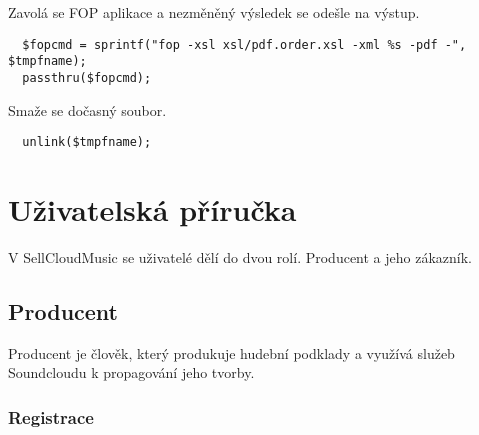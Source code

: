 \documentclass[12pt]{article}
\begin{document}
Zavolá se FOP aplikace a nezměněný výsledek se odešle na výstup.
\begin{lstlisting}
  $fopcmd = sprintf("fop -xsl xsl/pdf.order.xsl -xml %s -pdf -", $tmpfname);
  passthru($fopcmd);
\end{lstlisting}

Smaže se dočasný soubor.
\begin{lstlisting}
  unlink($tmpfname);
\end{lstlisting}    

\newpage

\section{Uživatelská příručka}

V SellCloudMusic se uživatelé dělí do dvou rolí. Producent a jeho zákazník.

\subsection{Producent}

Producent je člověk, který produkuje hudební podklady a využívá služeb Soundcloudu k propagování jeho tvorby.

\subsubsection{Registrace} \label{reg}
\end{document}
